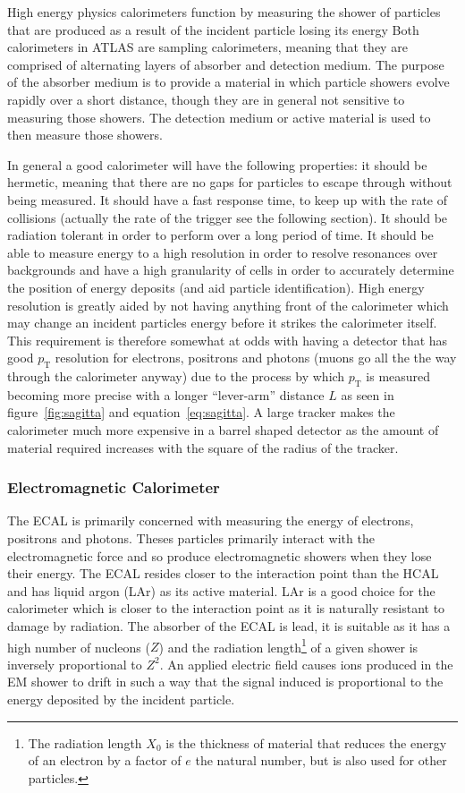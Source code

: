 High energy physics calorimeters function by measuring the shower
of particles that are produced as a result of the incident particle losing its
energy Both calorimeters in ATLAS are sampling calorimeters, meaning that they
are comprised of alternating layers of absorber and detection medium. The purpose
of the absorber medium is to provide a material in which particle showers evolve
rapidly over a short distance, though they are in general not sensitive to
measuring those showers. The detection medium or active material is used to then
measure those showers.

In general a good calorimeter will have the following properties: it should be
hermetic, meaning that there are no gaps for particles to escape through without
being measured. It should have a fast response time, to keep up with the rate of
collisions (actually the rate of the trigger see the following section). It
should be radiation tolerant in order to perform over a long period of time. It
should be able to measure energy to a high resolution in order to resolve
resonances over backgrounds and have a high granularity of cells in order to
accurately determine the position of energy deposits (and aid particle
identification). High energy resolution is greatly aided by not having anything
front of the calorimeter which may change an incident particles energy before it
strikes the calorimeter itself. This requirement is therefore somewhat at odds
with having a detector that has good $p_{\mathrm{T}}$ resolution for electrons,
positrons and photons (muons go all the the way through the calorimeter anyway)
due to the process by which $p_{\mathrm{T}}$ is measured becoming more precise
with a longer ``lever-arm'' distance $L$ as seen in figure~\ref{fig:sagitta} and
equation~\ref{eq:sagitta}. A large tracker makes the calorimeter much more
expensive in a barrel shaped detector as the amount of material required
increases with the square of the radius of the tracker.

\subsubsection{Electromagnetic Calorimeter}
The ECAL is primarily concerned with measuring the energy of electrons,
positrons and photons. Theses particles primarily interact with the
electromagnetic force and so produce electromagnetic showers when they lose
their energy. The ECAL resides closer to the interaction point than the HCAL and
has liquid argon (LAr) as its active material. LAr is a good choice for the
calorimeter which is closer to the interaction point as it is naturally
resistant to damage by radiation. The absorber of the ECAL is lead, it is
suitable as it has a high number of nucleons ($Z$) and the radiation
length\footnote{The radiation length $X_{0}$ is the thickness of material that
reduces the energy of an electron by a factor of $e$ the natural number, but is
also used for other particles.} of a given shower is inversely proportional to
$Z^2$. An applied electric field causes ions produced in the EM shower to drift
in such a way that the signal induced is proportional to the energy deposited by
the incident particle.

